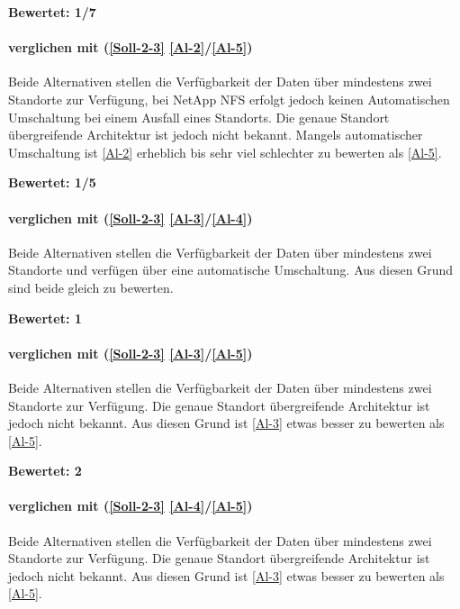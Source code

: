 \textbf{Bewertet: 1/7}

\paragraph*{  verglichen mit  (\ref{Soll-2-3} \ref{Al-2}/\ref{Al-5})}
Beide Alternativen stellen die Verfügbarkeit der Daten über mindestens zwei Standorte zur Verfügung, bei NetApp NFS erfolgt jedoch keinen Automatischen Umschaltung bei einem Ausfall eines Standorts. Die genaue Standort übergreifende Architektur ist jedoch nicht bekannt. Mangels automatischer Umschaltung ist  \ref{Al-2} erheblich bis sehr viel schlechter zu bewerten als  \ref{Al-5}.

\textbf{Bewertet: 1/5}

\paragraph*{  verglichen mit  (\ref{Soll-2-3} \ref{Al-3}/\ref{Al-4})}
Beide Alternativen stellen die Verfügbarkeit der Daten über mindestens zwei Standorte und verfügen über eine automatische Umschaltung. Aus diesen Grund sind beide gleich zu bewerten.

\textbf{Bewertet: 1}

\paragraph*{  verglichen mit  (\ref{Soll-2-3} \ref{Al-3}/\ref{Al-5})}
Beide Alternativen stellen die Verfügbarkeit der Daten über mindestens zwei Standorte zur Verfügung. Die genaue Standort übergreifende Architektur ist jedoch nicht bekannt. Aus diesen Grund ist  \ref{Al-3} etwas besser zu bewerten als  \ref{Al-5}.

\textbf{Bewertet: 2}

\paragraph*{  verglichen mit  (\ref{Soll-2-3} \ref{Al-4}/\ref{Al-5})}
Beide Alternativen stellen die Verfügbarkeit der Daten über mindestens zwei Standorte zur Verfügung. Die genaue Standort übergreifende Architektur ist jedoch nicht bekannt. Aus diesen Grund ist  \ref{Al-3} etwas besser zu bewerten als  \ref{Al-5}.

